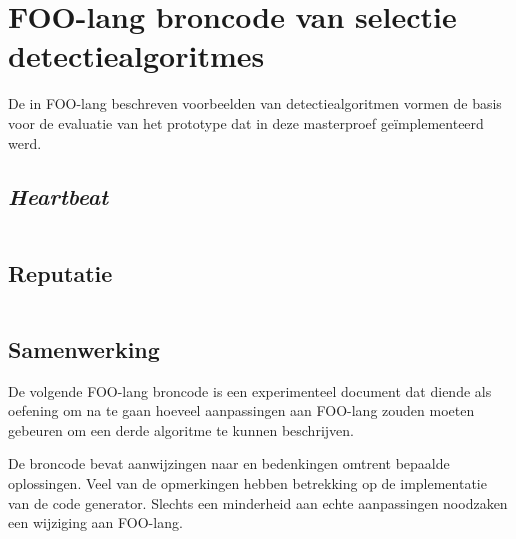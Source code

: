 
\chapter{FOO-lang broncode van selectie detectiealgoritmes}
\label{appendix:demo-code}

De in FOO-lang beschreven voorbeelden van detectiealgoritmen vormen de basis
voor de evaluatie van het prototype dat in deze masterproef ge\"implementeerd
werd.

\section{\emph{Heartbeat}}
\label{section:demo-code-heartbeat}

\inputminted[linenos,frame=lines,framesep=2mm,fontsize=\footnotesize]{js}{../src/foo-lang/examples/heartbeat.foo}
\vspace{-5mm}

\section{Reputatie}
\label{section:demo-code-reputation}

\inputminted[linenos,frame=lines,framesep=2mm,fontsize=\footnotesize]{js}{../src/foo-lang/examples/reputation.foo}
\vspace{-5mm}

\section{Samenwerking}
\label{section:demo-code-cooperation}

De volgende FOO-lang broncode is een experimenteel document dat diende als
oefening om na te gaan hoeveel aanpassingen aan FOO-lang zouden moeten gebeuren
om een derde algoritme te kunnen beschrijven.

De broncode bevat aanwijzingen naar en bedenkingen omtrent bepaalde
oplossingen. Veel van de opmerkingen hebben betrekking op de implementatie van
de code generator. Slechts een minderheid aan echte aanpassingen noodzaken een
wijziging aan FOO-lang.

\inputminted[linenos,frame=lines,framesep=2mm,fontsize=\footnotesize]{js}{../src/foo-lang/examples/cooperation.foo}
\vspace{-5mm}
